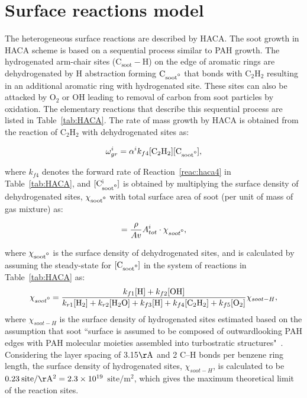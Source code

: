 \section{Surface reactions model}
\label{sec:surfreacmodel}
The heterogeneous surface reactions are described by HACA. The soot growth in HACA scheme is based on a sequential process similar to PAH growth. The hydrogenated arm-chair sites ($\mathrm{C_{soot}-H}$) on the edge of aromatic rings are dehydrogenated by H abstraction forming $\mathrm{C_{soot\mbox{\textdegree}}}$ that bonds with $\mathrm{C_2H_2}$ resulting in an additional aromatic ring with hydrogenated site. These sites can also be attacked by $\mathrm{O_2}$ or $\mathrm{OH}$ leading to removal of carbon from soot particles by oxidation. The elementary reactions that describe this sequential process are listed in Table~\ref{tab:HACA}.
The rate of mass growth by HACA is obtained from the reaction of $\mathrm{C_2H_2}$ with dehydrogenated sites as:

\begin{equation}
	\omega^i_{gr} = \alpha^i k_{f4} [\mathrm{C_2H_2}][\mathrm{C_{soot\mbox{\textdegree}}}]
	\label{eqn:hacaRate},
\end{equation}

\noindent  where ${k_{f4}}$ denotes the forward rate of Reaction~\eqref{reac:haca4} in Table~\ref{tab:HACA}, and $\mathrm{[C^i_{soot\mbox{\textdegree}}]}$ is obtained by multiplying the surface density of dehydrogenated sites, $\mathrm{\chi_{soot\mbox{\textdegree}}}$ with total surface area of soot (per unit of mass of gas mixture) as:

\begin{equation}
	[\mathrm{C^i_{soot\mbox{\textdegree}}}] = \frac{\rho}{Av}A^i_{tot}\cdot\chi_{soot\mbox{\textdegree}}
	\label{eqn:csoot0},
\end{equation}

\noindent where $\mathrm{\chi_{soot\mbox{\textdegree}}}$ is the surface density of dehydrogenated sites, and is calculated by assuming the steady-state for $\mathrm{[C_{soot\mbox{\textdegree}}]}$ in the system of reactions in Table~\ref{tab:HACA} as:
\begin{equation}
	\chi_{soot{\mbox{\textdegree}}} = 
	\frac
	{k_{f1}[\mathrm{H}]+k_{f2}[\mathrm{OH}]}
	{k_{r1}[\mathrm{H_2}]+k_{r2}[\mathrm{H_2O}]+k_{f3}[\mathrm{H}]+k_{f4}[\mathrm{C_2H_2}]+k_{f5}[\mathrm{O_2}]} \chi_{soot-{H}},
	\label{eqn:chisoot0}
\end{equation}
\noindent where ${\chi_{soot-{H}}}$ is the surface density of hydrogenated sites estimated based on the assumption that soot ``surface is assumed to be composed of outwardlooking PAH edges with PAH molecular moieties assembled into turbostratic structures"~\citep{frenklach2019new}. Considering the layer spacing of 3.15$\mathrm{\AA}$ and 2 C–H bonds per benzene ring length, the surface density of hydrogenated sites, $\chi_{{soot}-H}$, is calculated to be $0.23\:\mathrm{site/\AA^2}=2.3\times10^{19}$ $ \mathrm{site/m^2}$, which gives the maximum theoretical limit of the reaction sites.

